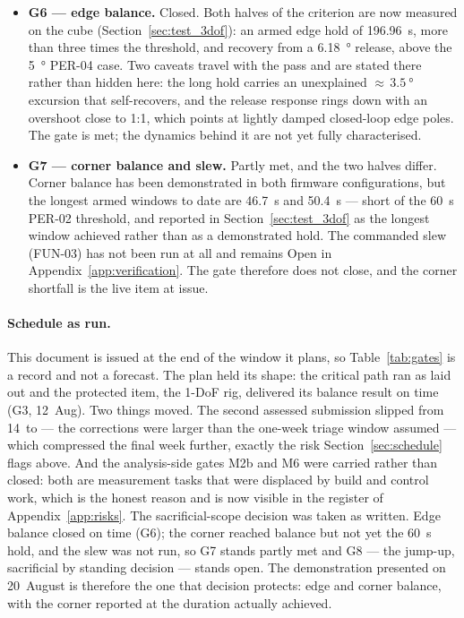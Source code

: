 \begin{itemize}
\item \textbf{G6 --- edge balance.} Closed. Both halves of the criterion are
now measured on the cube (Section~\ref{sec:test_3dof}): an armed edge hold of
\qty{196.96}{\second}, more than three times the threshold, and recovery from a
\qty{6.18}{\degree} release, above the \qty{5}{\degree} PER-04 case. Two
caveats travel with the pass and are stated there rather than hidden here: the
long hold carries an unexplained ${\approx}\,\qty{3.5}{\degree}$ excursion that
self-recovers, and the release response rings down with an overshoot close to
1:1, which points at lightly damped closed-loop edge poles. The gate is met;
the dynamics behind it are not yet fully characterised.

\item \textbf{G7 --- corner balance and slew.} Partly met, and the two halves
differ. Corner balance has been demonstrated in both firmware configurations,
but the longest armed windows to date are \qty{46.7}{\second} and
\qty{50.4}{\second} --- short of the \qty{60}{\second} PER-02 threshold, and
reported in Section~\ref{sec:test_3dof} as the longest window achieved rather
than as a demonstrated hold. The commanded slew (FUN-03) has not been run at
all and remains Open in Appendix~\ref{app:verification}. The gate therefore
does not close, and the corner shortfall is the live item at issue.
\end{itemize}

\paragraph{Schedule as run.} This document is issued at the end of the window
it plans, so Table~\ref{tab:gates} is a record and not a forecast. The plan held
its shape: the critical path ran as laid out and the protected item, the 1-DoF
rig, delivered its balance result on time (G3, 12~Aug). Two things moved. The
second assessed submission slipped from 14~to \docdate{} --- the corrections
were larger than the one-week triage window assumed --- which compressed the
final week further, exactly the risk Section~\ref{sec:schedule} flags above.
And the analysis-side gates M2b and M6 were carried rather than closed: both
are measurement tasks that were displaced by build and control work, which is
the honest reason and is now visible in the register of
Appendix~\ref{app:risks}. The sacrificial-scope decision was taken as written.
Edge balance closed on time (G6); the corner reached balance but not yet the
\qty{60}{\second} hold, and the slew was not run, so G7 stands partly met and
G8 --- the jump-up, sacrificial by standing decision --- stands open. The
demonstration presented on 20~August is therefore the one that decision
protects: edge and corner balance, with the corner reported at the duration
actually achieved.



